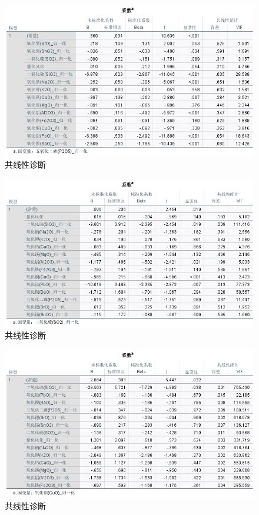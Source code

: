 \documentclass[UTF8]{ctexart}
\begin{document}
\begin{figure}[H]\centering
    \includegraphics[width=1\textwidth,height=0.6\textwidth]{img/1 (21).png} %
    \caption{共线性诊断} %
\end{figure}
\begin{figure}[H]\centering
    \includegraphics[width=1\textwidth,height=0.6\textwidth]{img/1 (22).png} %
    \caption{共线性诊断} %
\end{figure}
\begin{figure}[H]\centering
    \includegraphics[width=1\textwidth,height=0.6\textwidth]{img/1 (23).png} %
    \caption{共线性诊断} %
\end{figure}
\end{document}

